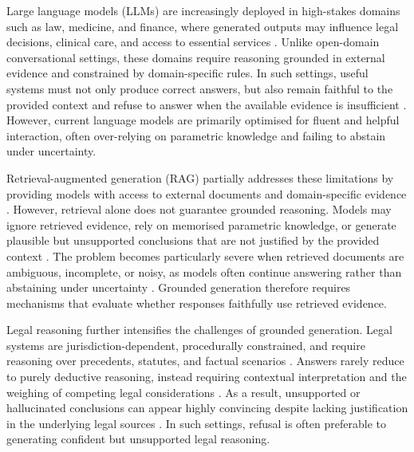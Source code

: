 \documentclass{article}
\theoremstyle{plain}
\theoremstyle{definition}
\theoremstyle{remark}
\begin{document}
Large language models (LLMs) are increasingly deployed in high-stakes domains such as law, medicine, and finance, where generated outputs may influence legal decisions, clinical care, and access to essential services \citep{siino2025exploring,costa2026public, chen2024a}. Unlike open-domain conversational settings, these domains require reasoning grounded in external evidence and constrained by domain-specific rules. In such settings, useful systems must not only produce correct answers, but also remain faithful to the provided context and refuse to answer when the available evidence is insufficient \citep{pipitone2024legalbench, peng-etal-2025-unanswerability}. However, current language models are primarily optimised for fluent and helpful interaction, often over-relying on parametric knowledge and failing to abstain under uncertainty.

Retrieval-augmented generation (RAG) partially addresses these limitations by providing models with access to external documents and domain-specific evidence \citep{Lewis_rag2020}. However, retrieval alone does not guarantee grounded reasoning. Models may ignore retrieved evidence, rely on memorised parametric knowledge, or generate plausible but unsupported conclusions that are not justified by the provided context \citep{Zheng_2025, huang2025survey}. The problem becomes particularly severe when retrieved documents are ambiguous, incomplete, or noisy, as models often continue answering rather than abstaining under uncertainty \citep{feng-etal-2024-dont,peng-etal-2025-unanswerability,butler2026legalragbenchendtoend}. Grounded generation therefore requires mechanisms that evaluate whether responses faithfully use retrieved evidence.


Legal reasoning further intensifies the challenges of grounded generation. Legal systems are jurisdiction-dependent, procedurally constrained, and require reasoning over precedents, statutes, and factual scenarios \citep{zhong-etal-2020-nlp, katz2023naturallanguageprocessinglegal, guha2023legalbench}. Answers rarely reduce to purely deductive reasoning, instead requiring contextual interpretation and the weighing of competing legal considerations \citep{guha2023legalbench, katz2024gpt, pipitone2024legalbench, fan2026lexam}. As a result, unsupported or hallucinated conclusions can appear highly convincing despite lacking justification in the underlying legal sources \citep{dahl2024_large_legal_fictions}. In such settings, refusal is often preferable to generating confident but unsupported legal reasoning.
\end{document}
